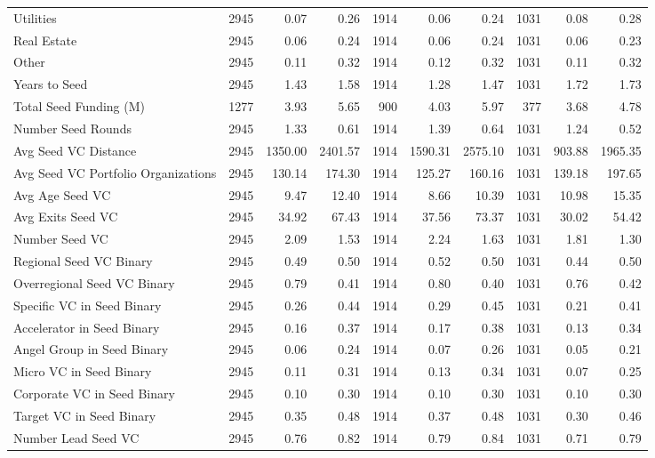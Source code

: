 {\begin{table}[!h]
{\begin{tabular}[t]{lrrrrrrrrr}
Utilities & 2945 & 0.07 & 0.26 & 1914 & 0.06 & 0.24 & 1031 & 0.08 & 0.28\\
Real Estate & 2945 & 0.06 & 0.24 & 1914 & 0.06 & 0.24 & 1031 & 0.06 & 0.23\\
Other & 2945 & 0.11 & 0.32 & 1914 & 0.12 & 0.32 & 1031 & 0.11 & 0.32\\
Years to Seed & 2945 & 1.43 & 1.58 & 1914 & 1.28 & 1.47 & 1031 & 1.72 & 1.73\\
\addlinespace
Total Seed Funding (M) & 1277 & 3.93 & 5.65 & 900 & 4.03 & 5.97 & 377 & 3.68 & 4.78\\
Number Seed Rounds & 2945 & 1.33 & 0.61 & 1914 & 1.39 & 0.64 & 1031 & 1.24 & 0.52\\
Avg Seed VC Distance & 2945 & 1350.00 & 2401.57 & 1914 & 1590.31 & 2575.10 & 1031 & 903.88 & 1965.35\\
Avg Seed VC Portfolio Organizations & 2945 & 130.14 & 174.30 & 1914 & 125.27 & 160.16 & 1031 & 139.18 & 197.65\\
Avg Age Seed VC & 2945 & 9.47 & 12.40 & 1914 & 8.66 & 10.39 & 1031 & 10.98 & 15.35\\
\addlinespace
Avg Exits Seed VC & 2945 & 34.92 & 67.43 & 1914 & 37.56 & 73.37 & 1031 & 30.02 & 54.42\\
Number Seed VC & 2945 & 2.09 & 1.53 & 1914 & 2.24 & 1.63 & 1031 & 1.81 & 1.30\\
Regional Seed VC Binary & 2945 & 0.49 & 0.50 & 1914 & 0.52 & 0.50 & 1031 & 0.44 & 0.50\\
Overregional Seed VC Binary & 2945 & 0.79 & 0.41 & 1914 & 0.80 & 0.40 & 1031 & 0.76 & 0.42\\
Specific VC in Seed Binary & 2945 & 0.26 & 0.44 & 1914 & 0.29 & 0.45 & 1031 & 0.21 & 0.41\\
\addlinespace
Accelerator in Seed Binary & 2945 & 0.16 & 0.37 & 1914 & 0.17 & 0.38 & 1031 & 0.13 & 0.34\\
Angel Group in Seed Binary & 2945 & 0.06 & 0.24 & 1914 & 0.07 & 0.26 & 1031 & 0.05 & 0.21\\
Micro VC in Seed Binary & 2945 & 0.11 & 0.31 & 1914 & 0.13 & 0.34 & 1031 & 0.07 & 0.25\\
Corporate VC in Seed Binary & 2945 & 0.10 & 0.30 & 1914 & 0.10 & 0.30 & 1031 & 0.10 & 0.30\\
Target VC in Seed Binary & 2945 & 0.35 & 0.48 & 1914 & 0.37 & 0.48 & 1031 & 0.30 & 0.46\\
\addlinespace
Number Lead Seed VC & 2945 & 0.76 & 0.82 & 1914 & 0.79 & 0.84 & 1031 & 0.71 & 0.79\\

\end{tabular}}
\end{table}}
